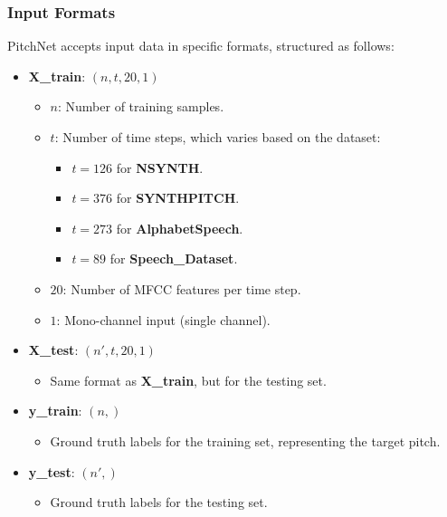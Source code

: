 \documentclass{ieeeaccess}
\begin{document}
\subsubsection{Input Formats}
PitchNet accepts input data in specific formats, structured as follows:

\begin{itemize}
    \item \textbf{X\_train}: \((n, t, 20, 1)\)
    \begin{itemize}
        \item \(n\): Number of training samples.
        \item \(t\): Number of time steps, which varies based on the dataset:
        \begin{itemize}
            \item \(t = 126\) for \textbf{NSYNTH}.
            \item \(t = 376\) for \textbf{SYNTHPITCH}.
            \item \(t = 273\) for \textbf{AlphabetSpeech}.
            \item \(t = 89\) for \textbf{Speech\_Dataset}.
        \end{itemize}
        \item \(20\): Number of MFCC features per time step.
        \item \(1\): Mono-channel input (single channel).
    \end{itemize}
    \item \textbf{X\_test}: \((n', t, 20, 1)\)
    \begin{itemize}
        \item Same format as \textbf{X\_train}, but for the testing set.
    \end{itemize}
    \item \textbf{y\_train}: \((n,)\)
    \begin{itemize}
        \item Ground truth labels for the training set, representing the target pitch.
    \end{itemize}
    \item \textbf{y\_test}: \((n',)\)
    \begin{itemize}
        \item Ground truth labels for the testing set.
    \end{itemize}
\end{itemize}
\end{document}
